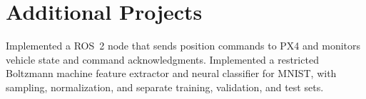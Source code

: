 \section{Additional Projects}
\cvItemsStart
\item Implemented a ROS~2 node that sends position commands to PX4 and monitors vehicle state and command acknowledgments.
\cvItemsEnd
{}
Implemented a restricted Boltzmann machine feature extractor and neural classifier for MNIST, with sampling, normalization, and separate training, validation, and test sets.
